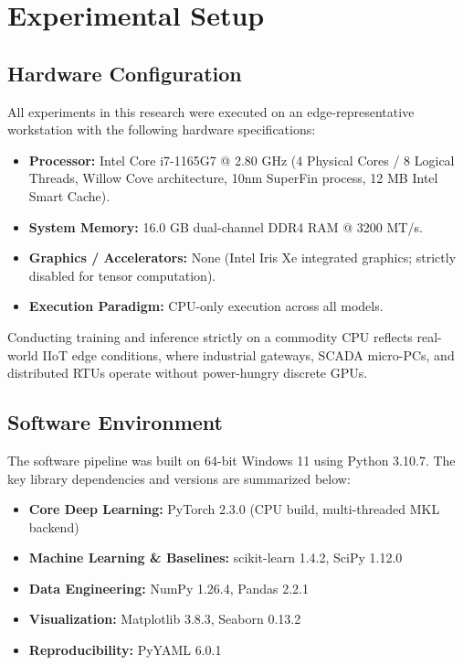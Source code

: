 \documentclass[12pt,a4paper,oneside]{report}
\begin{document}
\chapter{Experimental Setup}

\section{Hardware Configuration}
All experiments in this research were executed on an edge-representative workstation with the following hardware specifications:
\begin{itemize}
    \item \textbf{Processor:} Intel Core i7-1165G7 @ 2.80 GHz (4 Physical Cores / 8 Logical Threads, Willow Cove architecture, 10nm SuperFin process, 12 MB Intel Smart Cache).
    \item \textbf{System Memory:} 16.0 GB dual-channel DDR4 RAM @ 3200 MT/s.
    \item \textbf{Graphics / Accelerators:} None (Intel Iris Xe integrated graphics; strictly disabled for tensor computation).
    \item \textbf{Execution Paradigm:} CPU-only execution across all models.
\end{itemize}
Conducting training and inference strictly on a commodity CPU reflects real-world IIoT edge conditions, where industrial gateways, SCADA micro-PCs, and distributed RTUs operate without power-hungry discrete GPUs.

\section{Software Environment}
The software pipeline was built on 64-bit Windows 11 using Python 3.10.7. The key library dependencies and versions are summarized below:
\begin{itemize}
    \item \textbf{Core Deep Learning:} PyTorch 2.3.0 (CPU build, multi-threaded MKL backend)
    \item \textbf{Machine Learning \& Baselines:} scikit-learn 1.4.2, SciPy 1.12.0
    \item \textbf{Data Engineering:} NumPy 1.26.4, Pandas 2.2.1
    \item \textbf{Visualization:} Matplotlib 3.8.3, Seaborn 0.13.2
    \item \textbf{Reproducibility:} PyYAML 6.0.1
\end{itemize}
\end{document}

